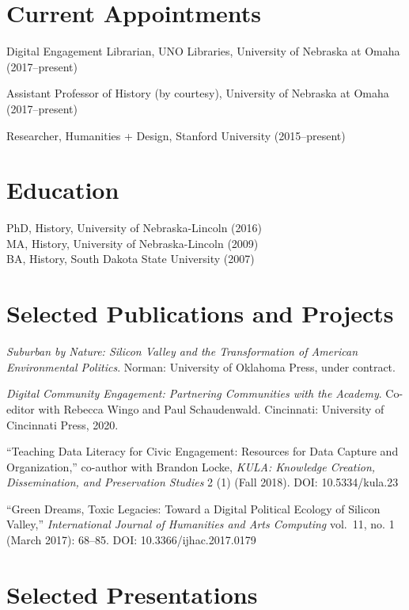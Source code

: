 \section{Current Appointments}\label{current-appointments}

Digital Engagement Librarian, UNO Libraries, University of Nebraska at
Omaha (2017--present)

Assistant Professor of History (by courtesy), University of Nebraska at
Omaha (2017--present)

Researcher, Humanities + Design, Stanford University (2015--present)

\section{Education}\label{education}

PhD, History, University of Nebraska-Lincoln (2016)\\
MA, History, University of Nebraska-Lincoln (2009)\\
BA, History, South Dakota State University (2007)

\section{Selected Publications and
Projects}\label{selected-publications-and-projects}

\emph{Suburban by Nature: Silicon Valley and the Transformation of
American Environmental Politics}. Norman: University of Oklahoma Press,
under contract.

\emph{Digital Community Engagement: Partnering Communities with the
Academy}. Co-editor with Rebecca Wingo and Paul Schaudenwald.
Cincinnati: University of Cincinnati Press, 2020.

``Teaching Data Literacy for Civic Engagement: Resources for Data
Capture and Organization,'' co-author with Brandon Locke, \emph{KULA:
Knowledge Creation, Dissemination, and Preservation Studies} 2 (1) (Fall
2018). DOI: 10.5334/kula.23

``Green Dreams, Toxic Legacies: Toward a Digital Political Ecology of
Silicon Valley,'' \emph{International Journal of Humanities and Arts
Computing} vol.~11, no. 1 (March 2017): 68--85. DOI:
10.3366/ijhac.2017.0179

\section{Selected Presentations}\label{selected-presentations}

